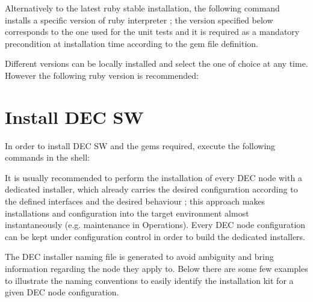 \documentclass[dec_sum_main.tex]{subfiles}
\begin{document}
\par
{} \newline
\par 
\noindent
Alternatively to the latest ruby stable installation, the following command installs a specific version of ruby interpreter ; the version specified below corresponds to the one used for the unit tests and it is required as a mandatory precondition at installation time according to the gem file definition.\newline

\par 
\noindent
Different versions can be locally installed and select the one of choice at any time. However the following ruby version is recommended:

 \newline

 \newline


\section{Install DEC SW}

In order to install DEC SW and the gems required, execute the following commands in the shell:
\par
{} \newline
{} \newline
\par

\par
\par
\noindent
It is usually recommended to perform the installation of every DEC node with a dedicated installer, which already carries the desired configuration according to the defined interfaces and the desired behaviour ; this approach makes installations and configuration into the target environment almost instantaneously (e.g. maintenance in Operations). Every DEC node configuration can be kept under configuration control in order to build the dedicated installers.\newline

\noindent
The DEC installer naming file is generated to avoid ambiguity and bring information regarding the node they apply to. Below there are some few examples to illustrate the naming conventions to easily identify the installation kit for a given DEC node configuration.\newline
\par
\end{document}
